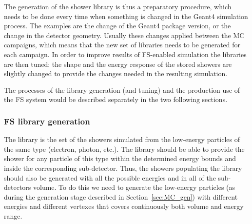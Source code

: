 \begin{figure}
\end{figure}

The generation of the shower library is thus a preparatory procedure, which needs to be done every time when something is changed in the Geant4 simulation process. The examples are the change of the Geant4 package version, or the change in the detector geometry. Usually these changes applied between the MC campaigns, which means that the new set of libraries needs to be generated for each campaign. In order to improve results of FS-enabled simulation the libraries are then tuned: the shape and the energy response of the stored showers are slightly changed to provide the changes needed in the resulting simulation.

The processes of the library generation (and tuning) and the production use of the FS system would be described separately in the two following sections.

\subsubsection{FS library generation}
\label{sec:MC_FS_gen}

The library is the set of the showers simulated from the low-energy particles of the same type (electron, photon, etc.). The library should be able to provide the shower for any particle of this type within the determined energy bounds and inside the corresponding sub-detector. Thus, the showers populating the library should also be generated with all the possible energies and in all of the sub-detectors volume. To do this we need to generate the low-energy particles (as during the generation stage described in Section~\ref{sec:MC_gen}) with different energies and different vertexes that covers continuously both volume and energy range.

